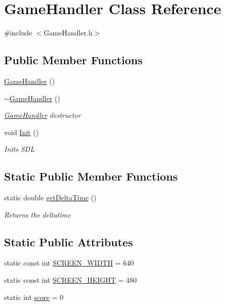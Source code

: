 \hypertarget{class_game_handler}{}\section{Game\+Handler Class Reference}
\label{class_game_handler}


{\ttfamily \#include $<$Game\+Handler.\+h$>$}

\subsection*{Public Member Functions}
\begin{DoxyCompactItemize}
\item 
\mbox{\hyperlink{class_game_handler_ad016ced8da1d660009e014a9aeb833da}{Game\+Handler}} ()
\item 
\mbox{\hyperlink{class_game_handler_a37e9acdced835f48a2bb2a00cb322635}{$\sim$\+Game\+Handler}} ()
\begin{DoxyCompactList}\small\item\em \mbox{\hyperlink{class_game_handler}{Game\+Handler}} destructor \end{DoxyCompactList}\item 
void \mbox{\hyperlink{class_game_handler_aba984ea50d3ce52070950c5aa24e0d7f}{Init}} ()
\begin{DoxyCompactList}\small\item\em Inits S\+DL \end{DoxyCompactList}\end{DoxyCompactItemize}
\subsection*{Static Public Member Functions}
\begin{DoxyCompactItemize}
\item 
static double \mbox{\hyperlink{class_game_handler_aebe798f7fee6c05c05bec6540f240238}{get\+Delta\+Time}} ()
\begin{DoxyCompactList}\small\item\em Returns the deltatime \end{DoxyCompactList}\end{DoxyCompactItemize}
\subsection*{Static Public Attributes}
\begin{DoxyCompactItemize}
\item 
static const int \mbox{\hyperlink{class_game_handler_a9ae6b1b8478a4bc1928f07d5e52d0b95}{S\+C\+R\+E\+E\+N\+\_\+\+W\+I\+D\+TH}} = 640
\item 
static const int \mbox{\hyperlink{class_game_handler_af09c16007a8cb793fa21dd5fb5d31201}{S\+C\+R\+E\+E\+N\+\_\+\+H\+E\+I\+G\+HT}} = 480
\item 
static int \mbox{\hyperlink{class_game_handler_a985aa228815f283446ce0f354f513e80}{score}} = 0
\end{DoxyCompactItemize}


